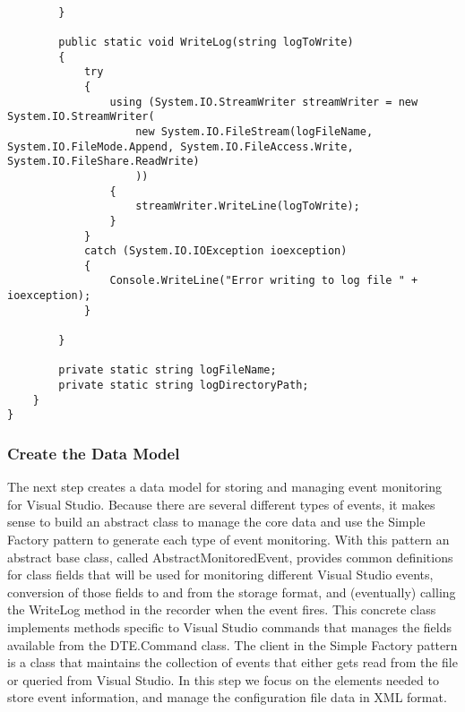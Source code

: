\begin{enumerate}
\begin{lstlisting}[caption=Data Recorder Class,  label=code:DataRecorder]
        
        }

        public static void WriteLog(string logToWrite)
        {
            try
            {
                using (System.IO.StreamWriter streamWriter = new System.IO.StreamWriter(
                    new System.IO.FileStream(logFileName, System.IO.FileMode.Append, System.IO.FileAccess.Write, System.IO.FileShare.ReadWrite)
                    ))
                {
                    streamWriter.WriteLine(logToWrite);
                }
            }
            catch (System.IO.IOException ioexception)
            {
                Console.WriteLine("Error writing to log file " + ioexception);
            }
        
        }

        private static string logFileName;
        private static string logDirectoryPath;
    }
}

\end{lstlisting}
\end{enumerate}

\subsubsection{Create the Data Model}

The next step creates a data model for storing and managing event monitoring for Visual Studio.  Because there are several different types of events, it makes sense to build an abstract class to manage the core data and use the Simple Factory pattern to generate each type of event monitoring.  With this pattern an abstract base class, called AbstractMonitoredEvent, provides common definitions for class fields that will be used for monitoring different Visual Studio events, conversion of those fields to and from the storage format, and (eventually) calling the WriteLog method in the recorder when the event fires.  This concrete class implements methods specific to Visual Studio commands that manages the fields available from the DTE.Command class.  The client in the Simple Factory pattern is a class that maintains the collection of events that either gets read from the file or queried from Visual Studio.   In this step we focus on the elements needed to store event information, and manage the configuration file data in XML format.

